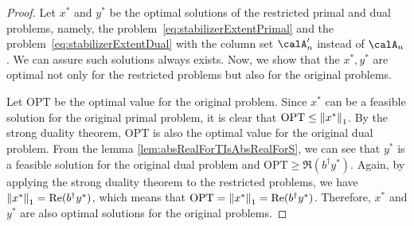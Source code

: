 \documentclass[a4paper, onecolumn, 11pt, longbibliography]{quantumarticle}
\begin{document}
\restrictedRealProblem*
\begin{proof}
  Let $x^*$ and $y^*$ be the optimal solutions
  of the restricted primal and dual problems,
  namely, the problem~\eqref{eq:stabilizerExtentPrimal}
  and the problem~\eqref{eq:stabilizerExtentDual}
  with the column set $\calA'_n$ instead of $\calA_n$.
  We can assure such solutions always exists.
  Now, we show that the $x^*, y^*$ are
  optimal not only for the restricted problems
  but also for the original problems.

  Let $\mathrm{OPT}$ be the optimal value for the original problem.
  Since $x^*$ can be a feasible solution for the original primal problem,
  it is clear that $\mathrm{OPT} \leq \norm{x^*}_1$.
  By the strong duality theorem,
  $\mathrm{OPT}$ is also the optimal value
  for the original dual problem.
  From the lemma \ref{lem:absRealForTIsAbsRealForS},
  we can see that $y^*$ is a feasible solution
  for the original dual problem and $\mathrm{OPT} \geq \Re(b^\dagger y^*)$.
  Again, by applying the strong duality theorem
  to the restricted problems,
  we have $\norm{x^*}_1 = \Re(b^\dagger y^*)$,
  which means that $\mathrm{OPT} = \norm{x^*}_1 = \Re(b^\dagger y^*)$.
  Therefore, $x^*$ and $y^*$ are also optimal solutions
  for the original problems.
\end{proof}
\end{document}

